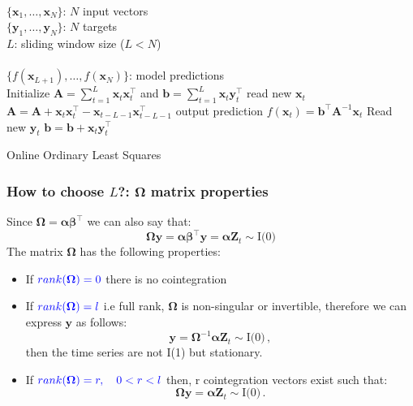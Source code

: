 \documentclass{beamer}
\begin{document}
\begin{frame}
\begin{algorithm}[H]
\begin{algorithmic}[1]
\REQUIRE $\,$ \\
$\{\mathbf{x}_1,\dots,\mathbf{x}_N \}$: $N$ input vectors \\
$\{\mathbf{y}_1,\dots,\mathbf{y}_N \}$: $N$ targets \\
$L$: sliding window size ($L<N$) \\
\ENSURE  $\,$ \\
$\{f(\mathbf{x}_{L+1}),\dots,f(\mathbf{x}_N) \}$: model predictions \\
\STATE Initialize $\mathbf{A}=\displaystyle \sum_{t=1}^L \mathbf{x}_t
\mathbf{x}_t^\intercal$
and $\mathbf{b}=\displaystyle \sum_{t=1}^L \mathbf{x}_t \mathbf{y}^\intercal_{t}$
        \STATE read new $\mathbf{x}_t$
        \STATE $\mathbf{A} = \mathbf{A} + \mathbf{x}_t \mathbf{x}_t^\intercal-
\mathbf{x}_{t-L-1} \mathbf{x}_{t-L-1}^\intercal  $
        \STATE output prediction $f(\mathbf{x}_t) =  \mathbf{b}^\intercal
\mathbf{A}^{-1}\mathbf{x}_t$
        \STATE Read new $\mathbf{y}_t$
        \STATE $\mathbf{b} = \mathbf{b} + \mathbf{x}_t \mathbf{y}^\intercal_{t}$
\ENDFOR
\end{algorithmic}
\caption{Online Ordinary Least Squares}
\label{alg:SLAAR}
\end{algorithm}
\end{frame}

\begin{frame}
\frametitle{How to choose $L$?: $\boldsymbol \Omega$ matrix properties}
Since $\boldsymbol \Omega = \boldsymbol \alpha \boldsymbol \beta^\intercal$ we can also say that:
$$\boldsymbol \Omega \mathbf{y} = \boldsymbol \alpha \boldsymbol \beta^\intercal \mathbf{y} = \boldsymbol \alpha \mathbf{Z}_t \sim \text{I(0)}$$
The matrix $\boldsymbol \Omega$ has the following properties:
\begin{itemize}
\item If ${\color{blue}rank(\boldsymbol \Omega) = 0}$ there is no cointegration
\item If ${\color{blue}rank(\boldsymbol\Omega)=l}$ i.e full rank, $\boldsymbol\Omega$ is non-singular or invertible, therefore we can express $\mathbf{y}$ as follows:
$$\mathbf{y} = \boldsymbol \Omega ^{-1} \boldsymbol \alpha \mathbf{Z}_t \sim \text{I(0)} \, ,$$
then the time series are not I(1) but stationary.
\item If ${\color{blue}rank(\boldsymbol\Omega)=r,\quad 0 < r < l}$ then, r cointegration vectors exist such that: 
$$\boldsymbol \Omega \mathbf{y} = \boldsymbol \alpha \mathbf{Z}_t \sim \text{I(0)} \, .$$
\end{itemize}
\end{frame}
\end{document}
